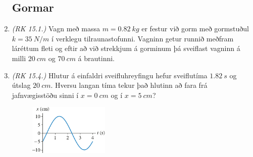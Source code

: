 \begin{enumerate}[label = \textbf{Dæmi \thechapter.\arabic*.}]

\subsection*{Gormar}

\item \textit{(RK 15.1.)} Vagn með massa $m = \SI{0.82}{kg}$ er festur við gorm með gormstuðul $k = \SI{35}{N/m}$ í verklegu tilraunastofunni. Vagninn getur runnið meðfram láréttum fleti og eftir að við strekkjum á gorminum þá sveiflast vagninn á milli $\SI{20}{cm}$ og $\SI{70}{cm}$ á brautinni.

\item \textit{(RK 15.4.)} Hlutur á einfaldri sveifluhreyfingu hefur sveiflutíma $\SI{1.82}{s}$ og útslag $\SI{20}{cm}$. Hversu langan tíma tekur það hlutinn að fara frá jafnvægisstöðu sinni í $x = \SI{0}{cm}$ og í $x = \SI{5}{cm}$?

\vspace{0.1cm}

\begin{minipage}{\linewidth}

\begin{figure}
\vspace{-0.75cm}
\includegraphics[width = 1.5in]{figures/stada-timi-graf3.pdf}
\end{figure}


\end{minipage}
\end{enumerate}
